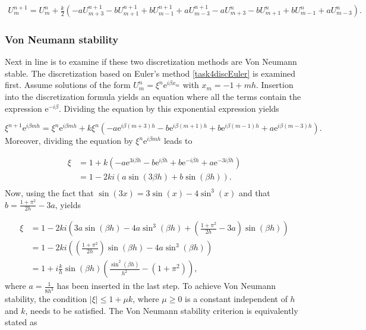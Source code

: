 \begin{equation}
\begin{split}
\label{task4discCrank}
    U_m^{n+1} = U_m^n + \frac{k}{2}\left(-a U_{m+3}^{n+1} - b U_{m+1}^{n+1} + b U_{m-1}^{n+1} + a U_{m-3}^{n+1} - a U_{m+3}^n - b U_{m+1}^n + b U_{m-1}^n +a U_{m-3}^n \right).
\end{split}
\end{equation}

\subsubsection*{Von Neumann stability}
Next in line is to examine if these two discretization methods are Von Neumann stable. The discretization based on Euler's method \eqref{task4discEuler} is examined first. Assume solutions of the form $U_m^n = \xi^n \mathrm{e}^{i\beta x_m}$ with $x_m = -1 + mh$. Insertion into the discretization formula yields an equation where all the terms contain the expression $\mathrm{e}^{-i\beta}$. Dividing the equation by this exponential expression yields 

\begin{equation*}
    \xi^{n+1} \mathrm{e}^{i\beta mh} = \xi^n \mathrm{e}^{i\beta mh} + k\xi^n (-a \mathrm{e}^{i\beta (m+3)h} - b\mathrm{e}^{i\beta (m+1)h} +b\mathrm{e}^{i\beta (m-1)h} +a \mathrm{e}^{i\beta (m-3)h}).
\end{equation*}
Moreover, dividing the equation by $\xi^n \mathrm{e}^{i\beta m h}$ leads to 

\begin{equation*}
\begin{split}
    \xi &= 1 + k(-a \mathrm{e}^{3 i\beta h} - b \mathrm{e}^{i\beta h} + b\mathrm{e}^{-i\beta h} + a\mathrm{e}^{-3 i\beta h}) \\
    &= 1 - 2ki(a \sin{(3 \beta h)} + b \sin{(\beta h)}).\\
\end{split}
\end{equation*}
Now, using the fact that $\sin{(3x)} = 3\sin{(x)} - 4\sin^3{(x)}$ and that $b = \frac{1+\pi^2}{2h} - 3a$, yields

\begin{align}
    \xi &= 1 - 2ki\left(3a\sin{(\beta h)}-4a\sin^3{(\beta h)}+\left(\frac{1+\pi^2}{2h}-3a\right)\sin{(\beta h)}\right) \nonumber\\
    &= 1 -2ki\left(\left(\frac{1+\pi^2}{2h}\right)\sin{(\beta h)}-4a\sin^3{(\beta h)}\right)\nonumber \\
    &= 1 + i\frac{k}{h}\sin{(\beta h)} \left(\frac{\sin^2{(\beta h)}}{h^2}-(1+\pi^2)\right),
    \label{xiEulerTask4a}
\end{align}
where $a=\frac{1}{8h^3}$ has been inserted in the last step. To achieve Von Neumann stability, the condition $|\xi| \leq 1 + \mu k$, where $\mu \geq 0$ is a constant independent of $h$ and $k$, needs to be satisfied. The Von Neumann stability criterion is equivalently stated as 

